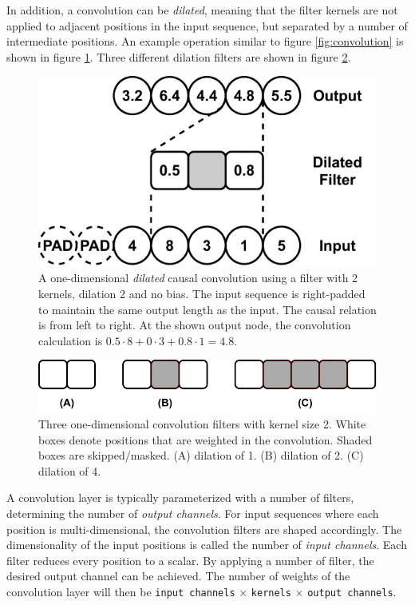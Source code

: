 In addition, a convolution can be \textit{dilated}, meaning that the filter kernels are not applied to adjacent positions in the input sequence, but separated by a number of intermediate positions. An example operation similar to figure \ref{fig:convolution} is shown in figure \ref{fig:dilated_convolution}. Three different dilation filters are shown in figure \ref{fig:filters}.

\begin{figure}[H]
    \centering
    \includegraphics{report/figures/dilated_convolution.pdf}
    \caption{A one-dimensional \textit{dilated} causal convolution using a filter with 2 kernels, dilation 2 and no bias. The input sequence is right-padded to maintain the same output length as the input. The causal relation is from left to right. At the shown output node, the convolution calculation is $0.5 \cdot 8 + 0 \cdot 3 + 0.8 \cdot 1 = 4.8$.}
    \label{fig:dilated_convolution}
\end{figure}

\begin{figure}[H]
    \centering
    \includegraphics{report/figures/filters.pdf}
    \caption{Three one-dimensional convolution filters with kernel size 2. White boxes denote positions that are weighted in the convolution. Shaded boxes are skipped/masked. (A) dilation of 1. (B) dilation of 2. (C) dilation of 4.}
    \label{fig:filters}
\end{figure}

A convolution layer is typically parameterized with a number of filters, determining the number of \textit{output channels}. For input sequences where each position is multi-dimensional, the convolution filters are shaped accordingly. The dimensionality of the input positions is called the number of \textit{input channels}. Each filter reduces every position to a scalar. By applying a number of filter, the desired output channel can be achieved. The number of weights of the convolution layer will then be \texttt{input channels} $\times$ \texttt{kernels} $\times$ \texttt{output channels}.

